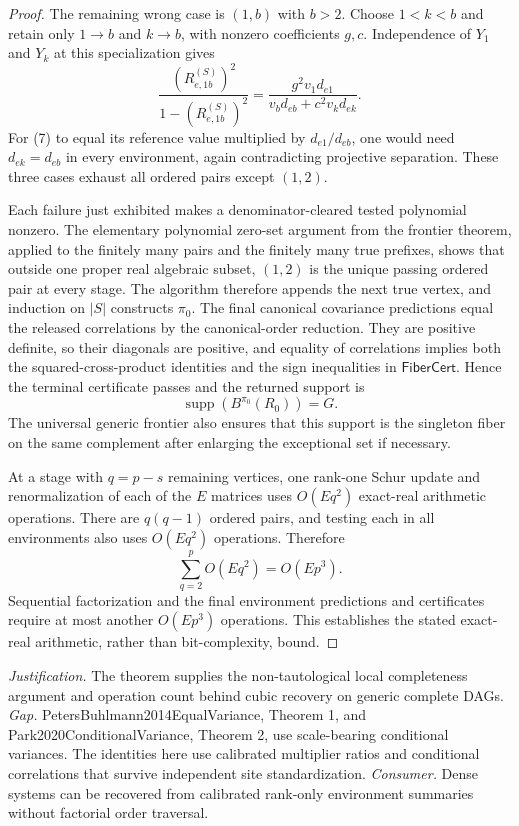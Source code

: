 \documentclass{article}
\begin{document}
\begin{proof}
The remaining wrong case is \((1,b)\) with \(b>2\).  Choose \(1<k<b\) and retain only \(1\to b\) and \(k\to b\), with nonzero coefficients \(g,c\).  Independence of \(Y_1\) and \(Y_k\) at this specialization gives
\[
 \frac{(R_{e,1b}^{(S)})^2}{1-(R_{e,1b}^{(S)})^2}
 =\frac{g^2v_1d_{e1}}{v_bd_{eb}+c^2v_kd_{ek}}. \tag{7}
\]
For (7) to equal its reference value multiplied by \(d_{e1}/d_{eb}\), one would need \(d_{ek}=d_{eb}\) in every environment, again contradicting projective separation.  These three cases exhaust all ordered pairs except \((1,2)\).

Each failure just exhibited makes a denominator-cleared tested polynomial nonzero.  The elementary polynomial zero-set argument from the frontier theorem, applied to the finitely many pairs and the finitely many true prefixes, shows that outside one proper real algebraic subset, \((1,2)\) is the unique passing ordered pair at every stage.  The algorithm therefore appends the next true vertex, and induction on \(|S|\) constructs \(\pi_0\).  The final canonical covariance predictions equal the released correlations by the canonical-order reduction.  They are positive definite, so their diagonals are positive, and equality of correlations implies both the squared-cross-product identities and the sign inequalities in \(\mathsf{FiberCert}\).  Hence the terminal certificate passes and the returned support is
\[
 \operatorname{supp}(B^{\pi_0}(R_0))=G.
\]
The universal generic frontier also ensures that this support is the singleton fiber on the same complement after enlarging the exceptional set if necessary.

At a stage with \(q=p-s\) remaining vertices, one rank-one Schur update and renormalization of each of the \(E\) matrices uses \(O(Eq^2)\) exact-real arithmetic operations.  There are \(q(q-1)\) ordered pairs, and testing each in all environments also uses \(O(Eq^2)\) operations.  Therefore
\[
 \sum_{q=2}^{p}O(Eq^2)=O(Ep^3).
\]
Sequential factorization and the final environment predictions and certificates require at most another \(O(Ep^3)\) operations.  This establishes the stated exact-real arithmetic, rather than bit-complexity, bound.
\end{proof}
\par\smallskip\noindent \textit{Justification.} The theorem supplies the non-tautological local completeness argument and operation count behind cubic recovery on generic complete DAGs. \textit{Gap.} PetersBuhlmann2014EqualVariance, Theorem 1, and Park2020ConditionalVariance, Theorem 2, use scale-bearing conditional variances. The identities here use calibrated multiplier ratios and conditional correlations that survive independent site standardization. \textit{Consumer.} Dense systems can be recovered from calibrated rank-only environment summaries without factorial order traversal.
\end{document}
